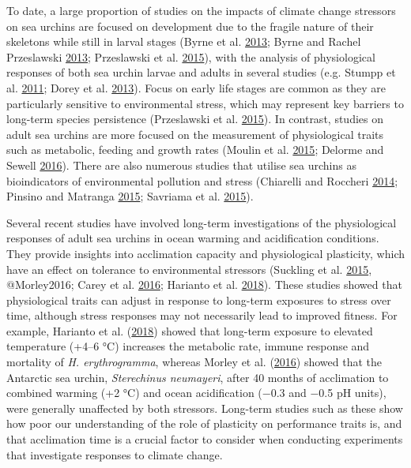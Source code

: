 \documentclass[a4paper,10pt, oneside]{memoir}
\begin{document}
To date, a large proportion of studies on the impacts of climate change stressors on sea urchins are focused on development due to the fragile nature of their skeletons while still in larval stages (Byrne et al. \protect\hyperlink{ref-Byrne2013}{2013}; Byrne and Rachel Przeslawski \protect\hyperlink{ref-Byrne2013a}{2013}; Przeslawski et al. \protect\hyperlink{ref-Przeslawski2015}{2015}), with the analysis of physiological responses of both sea urchin larvae and adults in several studies (e.g. Stumpp et al. \protect\hyperlink{ref-Stumpp2011}{2011}; Dorey et al. \protect\hyperlink{ref-Dorey2013}{2013}).
Focus on early life stages are common as they are particularly sensitive to environmental stress, which may represent key barriers to long-term species persistence (Przeslawski et al. \protect\hyperlink{ref-Przeslawski2015}{2015}).
In contrast, studies on adult sea urchins are more focused on the measurement of physiological traits such as metabolic, feeding and growth rates (Moulin et al. \protect\hyperlink{ref-Moulin2015}{2015}; Delorme and Sewell \protect\hyperlink{ref-Delorme2016}{2016}).
There are also numerous studies that utilise sea urchins as bioindicators of environmental pollution and stress (Chiarelli and Roccheri \protect\hyperlink{ref-Chiarelli2014}{2014}; Pinsino and Matranga \protect\hyperlink{ref-Pinsino2015}{2015}; Savriama et al. \protect\hyperlink{ref-Savriama2015}{2015}).

Several recent studies have involved long-term investigations of the physiological responses of adult sea urchins in ocean warming and acidification conditions.
They provide insights into acclimation capacity and physiological plasticity, which have an effect on tolerance to environmental stressors (Suckling et al. \protect\hyperlink{ref-Suckling2015}{2015}, @Morley2016; Carey et al. \protect\hyperlink{ref-Carey2016}{2016}; Harianto et al. \protect\hyperlink{ref-Harianto2018}{2018}).
These studies showed that physiological traits can adjust in response to long-term exposures to stress over time, although stress responses may not necessarily lead to improved fitness.
For example, Harianto et al. (\protect\hyperlink{ref-Harianto2018}{2018}) showed that long-term exposure to elevated temperature (+4--6 °C) increases the metabolic rate, immune response and mortality of \emph{H. erythrogramma}, whereas Morley et al. (\protect\hyperlink{ref-Morley2016}{2016}) showed that the Antarctic sea urchin, \emph{Sterechinus neumayeri}, after 40 months of acclimation to combined warming (+2 °C) and ocean acidification (−0.3 and −0.5 pH units), were generally unaffected by both stressors.
Long-term studies such as these show how poor our understanding of the role of plasticity on performance traits is, and that acclimation time is a crucial factor to consider when conducting experiments that investigate responses to climate change.
\end{document}
